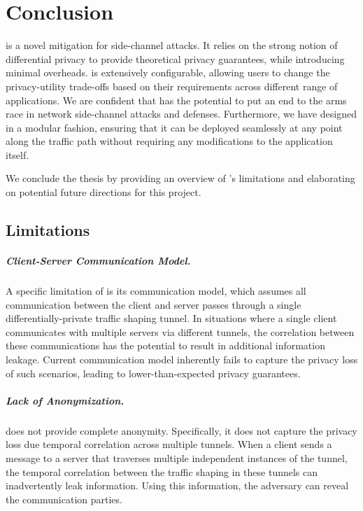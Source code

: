 \chapter{Conclusion}\label{ch:conclusion}
{\sys} is a novel mitigation for side-channel attacks. 
It relies on the strong notion of differential privacy to provide theoretical privacy guarantees, while introducing minimal overheads. 
{\sys} is extensively configurable, allowing users to change the privacy-utility trade-offs based on their requirements across different range of applications. 
We are confident that {\sys} has the potential to put an end to the arms race in network side-channel attacks and defenses.  
Furthermore, we have designed {\sys} in a modular fashion, ensuring that it can be deployed seamlessly at any point along the traffic path without requiring any modifications to the application itself. 

We conclude the thesis by providing an overview of {\sys}'s limitations and elaborating on potential future directions for this project.

\section{{\sys} Limitations}\label{sec:conclusion-limitations}
\paragraph{Client-Server Communication Model.}
A specific limitation of {\sys} is its communication model, which assumes all communication between the client and server passes through a single differentially-private traffic shaping tunnel.
In situations where a single client communicates with multiple servers via different tunnels, the correlation between these communications has the potential to result in additional information leakage.
Current communication model inherently fails to capture the privacy loss of such scenarios, leading to lower-than-expected privacy guarantees.

\paragraph{Lack of Anonymization.}
{\sys} does not provide complete anonymity.
Specifically, it does not capture the privacy loss due temporal correlation across multiple tunnels.
When a client sends a message to a server that traverses multiple independent instances of the {\sys} tunnel, the temporal correlation between the traffic shaping in these tunnels can inadvertently leak information. 
Using this information, the adversary can reveal the communication parties.

